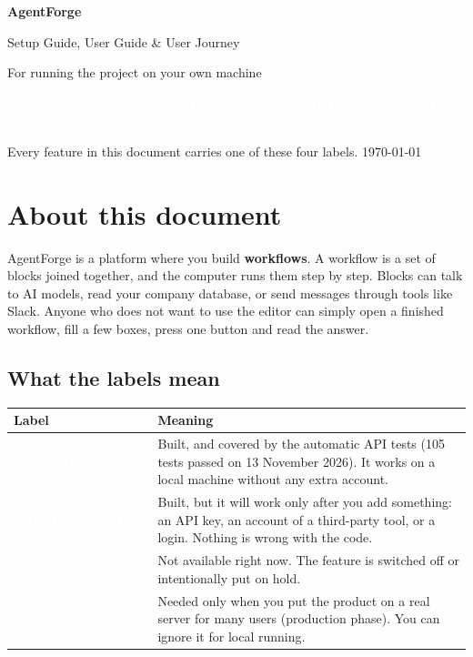\documentclass[11pt,a4paper]{article}
\newcommand{\sWork}{\colorbox{okc}{\textcolor{white}{\scriptsize\bfseries\ WORKING\ }}}
\newcommand{\sSetup}{\colorbox{setupc}{\textcolor{white}{\scriptsize\bfseries\ NEEDS\ SETUP\ }}}
\newcommand{\sPaused}{\colorbox{pausedc}{\textcolor{white}{\scriptsize\bfseries\ NOT\ WORKING\ }}}
\newcommand{\sDeploy}{\colorbox{deployc}{\textcolor{white}{\scriptsize\bfseries\ DEPLOYMENT\ }}}
\begin{document}
\begin{titlepage}
  \centering
  \vspace*{3cm}
  {\Huge\bfseries\color{brand} AgentForge\par}
  \vspace{0.6cm}
  {\Large Setup Guide, User Guide \& User Journey\par}
  \vspace{0.5cm}
  {\large For running the project on your own machine\par}
  \vspace{1.5cm}
  \sWork\ \sSetup\ \sPaused\ \sDeploy\par
  \vspace{0.3cm}
  {\small Every feature in this document carries one of these four labels.}
  \vfill
  {\large \today}
  \vspace{2cm}
\end{titlepage}

\tableofcontents
\newpage

\section{About this document}

AgentForge is a platform where you build \textbf{workflows}. A workflow is a set of
blocks joined together, and the computer runs them step by step. Blocks can talk to
AI models, read your company database, or send messages through tools like Slack.
Anyone who does not want to use the editor can simply open a finished workflow, fill
a few boxes, press one button and read the answer.

\subsection{What the labels mean}

\begin{longtable}{@{}L{3.4cm}L{12.2cm}@{}}
\toprule
\textbf{Label} & \textbf{Meaning} \\
\midrule
\endhead
\sWork & Built, and covered by the automatic API tests (105 tests passed on 13 November 2026). It works on a local machine without any extra account. \\
\sSetup & Built, but it will work only after you add something: an API key, an account of a third-party tool, or a login. Nothing is wrong with the code. \\
\sPaused & Not available right now. The feature is switched off or intentionally put on hold. \\
\sDeploy & Needed only when you put the product on a real server for many users (production phase). You can ignore it for local running. \\
\bottomrule
\end{longtable}
\end{document}
